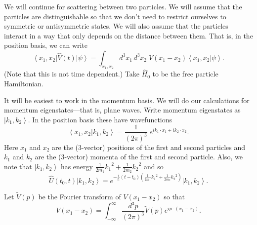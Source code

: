\documentclass[11pt]{article}
\newcommand{\bra}[1]{\left\langle#1\right|}
\newcommand{\ket}[1]{\left|#1\right\rangle}
\newcommand{\braket}[2]{\left\langle#1|#2\right\rangle}
\newcommand{\op}[1]{\hat{#1}}
\theoremstyle{theorem}
\theoremstyle{remark}
\theoremstyle{step}
\theoremstyle{gap}
\begin{document}
We will continue for scattering between two particles. We will assume that the particles are distinguishable so that we don't need to restrict ourselves to symmetric or antisymmetric states. We will also assume that the particles interact in a way that only depends on the distance between them. That is, in the position basis, we can write
\begin{equation}\label{eq.Vposbasis}
\bra{x_1, x_2}\op{V}(t)\ket{\psi} = \int_{x_1,x_2} {d^3 x_1 \,d^3x_2}\; V(x_1 - x_2) \braket{x_1, x_2}{\psi}.
\end{equation}
(Note that this is not time dependent.) Take \(\op{H}_0\) to be the free particle Hamiltonian.

It will be easiest to work in the momentum basis. We will do our calculations for momentum eigenstates---that is, plane waves. Write momentum eigenstates as \(\ket{k_1, k_2}\). In the position basis these have wavefunctions
\begin{equation}\label{eq.momentuminpos}
\braket{x_1, x_2}{k_1, k_2} = \frac{1}{(2\pi)^3}\;e^{ik_1\cdot x_1 + ik_2\cdot x_2}.
\end{equation}
Here \(x_1\) and \(x_2\) are the (3-vector) positions of the first and second particles and \(k_1\) and \(k_2\) are the (3-vector) momenta of the first and second particle. Also, we note that \(\ket{k_1, k_2}\) has energy \(\frac{1}{2m_1}{k_1}^2 + \frac{1}{2m_2}{k_2}^2\) and so
\begin{equation}
\label{eq.timeevonk}
\op{U}(t_0, t) \ket{k_1, k_2} = e^{-\frac{i}{\hbar}\left(t-t_0\right)\left(\frac{1}{2m_1}{k_1}^2 + \frac{1}{2m_2}{k_2}^2\right)} \ket{k_1, k_2}.
\end{equation}

Let \(\widetilde{V}(p)\) be the Fourier transform of \(V(x_1 - x_2)\) so that
\begin{equation}
\label{eq.ftV}
V(x_1 - x_2) = \int_{-\infty}^{\infty} \frac{d^3 p}{(2 \pi)^3} \widetilde{V}(p) e^{ip\cdot(x_1 - x_2)}.
\end{equation}
\end{document}
